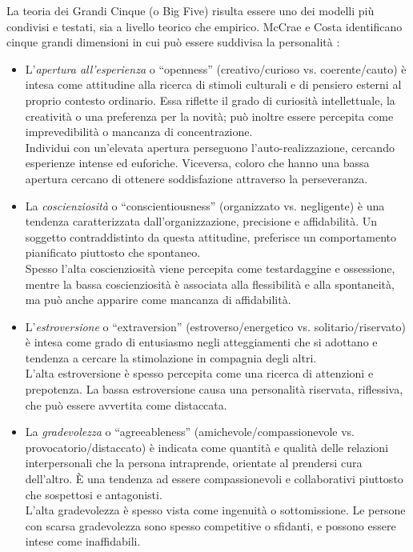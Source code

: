 La teoria dei Grandi Cinque (o Big Five) risulta essere uno dei modelli più condivisi e testati, sia a livello teorico che empirico.
McCrae e Costa identificano cinque grandi dimensioni in cui può essere suddivisa la personalità \cite{goldberg1993structure,costa2008revised}:
\begin{itemize}
	\item L'\emph{apertura all'esperienza} o ``openness'' (creativo/curioso vs. coerente/cauto) è intesa come attitudine alla ricerca di stimoli culturali e di pensiero esterni al proprio contesto ordinario.
	Essa riflette il grado di curiosità intellettuale, la creatività o una preferenza per la novità; può inoltre essere percepita come imprevedibilità o mancanza di concentrazione. \\ 
	Individui con un'elevata apertura perseguono l'auto-realizzazione, cercando esperienze intense ed euforiche. Viceversa, coloro che hanno una bassa apertura cercano di ottenere soddisfazione attraverso la perseveranza.
	
	\item La \emph{coscienziosità} o ``conscientiousness'' (organizzato vs. negligente) è una tendenza caratterizzata dall'organizzazione, precisione e affidabilità. Un soggetto contraddistinto da questa attitudine, preferisce un comportamento pianificato piuttosto che spontaneo.\\  
	Spesso l'alta coscienziosità viene percepita come testardaggine e ossessione, mentre la bassa coscienziosità è associata alla flessibilità e alla spontaneità, ma può anche apparire come mancanza di affidabilità.
		
	\item L'\emph{estroversione} o ``extraversion''  (estroverso/energetico vs. solitario/riservato) è intesa come grado di entusiasmo negli atteggiamenti che si adottano e tendenza a cercare la stimolazione in compagnia degli altri.\\ 
	L'alta estroversione è spesso percepita come una ricerca di attenzioni e prepotenza. La bassa estroversione causa una personalità riservata, riflessiva, che può essere avvertita come distaccata.  
	
	\item La \emph{gradevolezza} o ``agreeableness'' (amichevole/compassionevole vs. provocatorio/distaccato) è indicata come quantità e qualità delle relazioni interpersonali che la persona intraprende, orientate al prendersi cura dell'altro. È una tendenza ad essere compassionevoli e collaborativi piuttosto che sospettosi e antagonisti. \\
	L'alta gradevolezza è spesso vista come ingenuità o sottomissione. Le persone con scarsa gradevolezza sono spesso competitive o sfidanti, e possono essere intese come inaffidabili.


\end{itemize}
